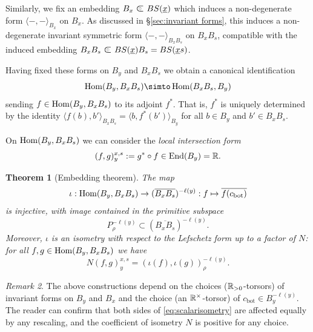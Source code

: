 \documentclass[11pt]{amsart}
\numberwithin{equation}{section}
\def\BS{{\EuScript B}}
\def\bot{{\mathrm{bot}}}
\def\ov{\overline}
\def\un{\underline}
\def\to{\rightarrow}
\def\summand{
\mathbin{\tikz [baseline=-3pt]
{
\clip (-0.2,-0.15) rectangle (0.2,0.15);
\node[scale=1.2] at (0,0) {$\subset$}; \node[scale=0.5] at
  (0,0) {$\oplus$}; }}
}
\DeclareMathOperator{\End}{End} %
\newtheorem{thm}{Theorem}[section]
\theoremstyle{definition}
\theoremstyle{remark}
\newtheorem{remark}[thm]{Remark}
\begin{document}
Similarly, we fix an embedding $B_x \summand BS(\un{x})$ which induces
a non-degenerate form $\langle -, - \rangle_{B_x}$ on $B_x$. As discussed
in \S\ref{sec:invariant forms}, this induces a non-degenerate
invariant symmetric form $\langle -,- \rangle_{B_xB_s}$ on 
$B_x B_s$, compatible with the induced embedding $B_x B_s \summand
BS(\un{x})B_s = BS(\un{x}s)$. 

Having fixed these forms on $B_y$ and $B_xB_s$ we obtain a canonical identification \[ \Hom(B_y, B_xB_s) \simto \Hom(B_xB_s, B_y) \] sending $f \in \operatorname{Hom}(B_y, B_xB_s)$ to its adjoint
$f^*$. That is, $f^*$ is uniquely determined by the identity $\langle f(b), b' \rangle_{B_x B_s} = \langle b, f^*(b') \rangle_{B_y}$ for all $b \in B_y$ and $b' \in B_xB_s$.

 On
$\operatorname{Hom}(B_y, B_xB_s)$ we can consider the \emph{local
intersection form}
\[ (f, g)_y^{x,s} := g^* \circ f \in \End(B_y) = \RM. \]

\begin{thm}[Embedding theorem] \label{thm:embedding}
The map
\begin{gather*}
\iota : \Hom(B_y, B_xB_s) \to
(\ov{B_xB_s})^{-\ell(y)}  : f \mapsto \ov{f(c_\bot)}
\end{gather*}
is injective, with image contained in the primitive subspace
  \[ P^{-\ell(y)}_\rho \subset (\ov{B_xB_s})^{-\ell(y)}.\]Moreover,
  $\iota$ is an isometry with respect to the Lefschetz form up to a
  factor of $N$: for all
  $f, g \in \operatorname{Hom}(B_y, B_xB_s)$ we have
\begin{equation} \label{eq:scalarisometry}
N(f, g)_y^{x,s} = (\iota(f), \iota(g))^{-\ell(y)}_\rho.
\end{equation}
\end{thm}

\begin{remark} The above constructions depend on the choices (${\mathbb{R}}_{>0}$-torsors) of invariant forms on $B_y$ and $B_x$ and the choice (an ${\mathbb{R}}^\times$-torsor) of $c_\bot \in
B_y^{-\ell(y)}$. The reader can confirm that both sides of
\eqref{eq:scalarisometry} are affected equally by any rescaling, and the coefficient of isometry $N$
is positive for any choice. \end{remark}

\end{document}
